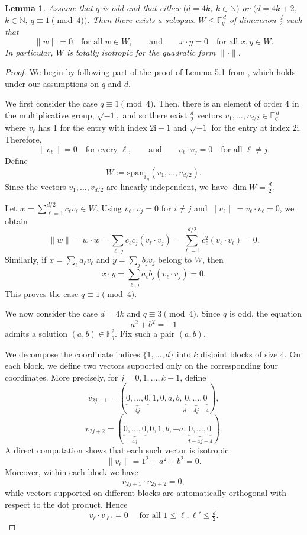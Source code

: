 \documentclass{article}
\newtheorem{lemma}[theorem]{Lemma}
\begin{document}
\begin{lemma}\label{lem:exist-isotropic}
Assume that $q$ is odd and that either $(d=4k$, $k \in \mathbb{N})$ or $(d=4k+2$, $k \in \mathbb{N}, ~q \equiv 1 \pmod {4})$.
Then there exists a subspace $W\le \mathbb{F}_q^{\,d}$ of dimension $\frac d2$ such that
\[
\|w\|=0 \quad \text{for all } w\in W,
\qquad\text{and}\qquad
x\cdot y=0 \quad \text{for all } x,y\in W.
\]
In particular, $W$ is totally isotropic for the quadratic form $\|\cdot\|$.
\end{lemma}


\begin{proof}
We begin by following part of the proof of Lemma 5.1 from \cite{HIKR11}, which holds under our assumptions on $q$ and $d$.

We first consider the case $q \equiv 1 \pmod 4$. Then, there is an element of order 4 in the multiplicative group, $\sqrt{-1},$ and so there exist $\frac d2$ vectors
$v_1,\dots,v_{d/2}\in \mathbb{F}_q^{\,d}$ where $v_\ell$ has 1 for the entry with index $2\mathrm{i}-1$ and $\sqrt{-1}$ for the entry at index $2\mathrm{i}$. Therefore,
\[
\|v_\ell \|=0 \quad \text{for every } \ell,
\qquad\text{and}\qquad
v_\ell\cdot v_j=0 \quad \text{for all } \ell\neq j.
\]
Define
\[
W:=\mathrm{span}_{\mathbb{F}_q}(v_1,\dots,v_{d/2}).
\]
Since the vectors $v_1,\dots,v_{d/2}$ are linearly independent, we have $\dim W=\frac d2$.

Let $w=\sum\limits_{\ell=1}^{d/2} c_\ell v_\ell\in W$.
Using $v_\ell\cdot v_j=0$ for $i\neq j$ and $\|v_\ell\|=v_\ell\cdot v_\ell=0$, we obtain
\[
\|w\|
=
w\cdot w
=
\sum_{\ell,j} c_\ell c_j (v_\ell\cdot v_j)
=
\sum_{\ell=1}^{d/2} c_\ell^2 (v_\ell \cdot v_\ell)
=
0.
\]
Similarly, if $x=\sum\limits_\ell a_\ell v_\ell$ and $y=\sum\limits_j b_j v_j$ belong to $W$, then
\[
x\cdot y
=
\sum_{\ell,j} a_\ell b_j (v_\ell\cdot v_j)
=
0.
\]
This proves the case $q \equiv 1 \pmod 4$.

We now consider the case $d=4k$ and $q\equiv 3 \pmod 4$.
Since $q$ is odd, the equation
\[
a^2+b^2=-1
\]
admits a solution $(a,b)\in\mathbb F_q^2$.
Fix such a pair $(a,b)$.

We decompose the coordinate indices $\{1,\dots,d\}$ into $k$ disjoint blocks of size $4$.
On each block, we define two vectors supported only on the corresponding four coordinates.
More precisely, for $j=0,1,\dots,k-1$, define
\[
v_{2j+1}
=
(\underbrace{0,\dots,0}_{4j},
1,0,a,b,
\underbrace{0,\dots,0}_{d-4j-4}),
\]
\[
v_{2j+2}
=
(\underbrace{0,\dots,0}_{4j},
0,1,b,-a,
\underbrace{0,\dots,0}_{d-4j-4}).
\]
A direct computation shows that each such vector is isotropic:
\[
\|v_\ell\| = 1^2 + a^2 + b^2 = 0.
\]
Moreover, within each block we have
\[
v_{2j+1}\cdot v_{2j+2}=0,
\]
while vectors supported on different blocks are automatically orthogonal with respect to the dot product.
Hence
\[
v_\ell\cdot v_{\ell'}=0
\quad \text{ for all } 1\le \ell, \ell'\le \tfrac d2.
\]


\end{proof}
\end{document}
